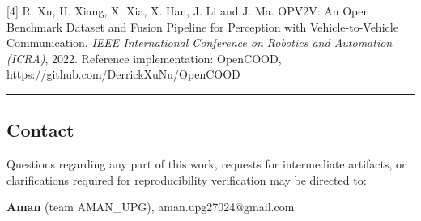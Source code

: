 \documentclass[
  10pt,
]{article}
\begin{document}
{[}4{]} R. Xu, H. Xiang, X. Xia, X. Han, J. Li and J. Ma. OPV2V: An Open
Benchmark Dataset and Fusion Pipeline for Perception with
Vehicle-to-Vehicle Communication. \emph{IEEE International Conference on
Robotics and Automation (ICRA)}, 2022. Reference implementation:
OpenCOOD, https://github.com/DerrickXuNu/OpenCOOD

\begin{center}\rule{0.5\linewidth}{0.5pt}\end{center}

\subsection{Contact}\label{contact}

Questions regarding any part of this work, requests for intermediate
artifacts, or clarifications required for reproducibility verification
may be directed to:

\textbf{Aman} (team AMAN\_UPG), aman.upg27024@gmail.com
\end{document}
